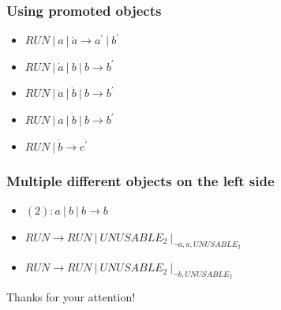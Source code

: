     \begin{frame}[t]\frametitle{Using promoted objects}
      \begin{itemize}
        \item $RUN\ |\ a\ |\ \dot{a} \rightarrow a^{\prime}\ |\ b^{\prime}$
        \item $RUN\ |\ \dot{a}\ |\ b\ |\ b \rightarrow b^{\prime}$
        \item $RUN\ |\ \dot{a}\ |\ \dot{b}\ |\ b \rightarrow b^{\prime}$
        \item $RUN\ |\ a\ |\ \dot{b}\ |\ b \rightarrow b^{\prime}$
        \item $RUN\ |\ \dot{b} \rightarrow c^{\prime}$
      \end{itemize}
    \end{frame}
    \note{}

    \begin{frame}[t]\frametitle{Multiple different objects on the left side}
      \begin{itemize}
        \item $(2): a\ |\ b\ |\ b \rightarrow b$
        \item $RUN \rightarrow RUN\ |\ UNUSABLE_2\ |_{\neg{a,\dot{a},UNUSABLE_2}}$
        \item $RUN \rightarrow RUN\ |\ UNUSABLE_2\ |_{\neg{b,UNUSABLE_2}}$
      \end{itemize}
    \end{frame}
    \note{}

    \begin{frame}[plain]
      \begin{center}
        Thanks for your attention!
      \end{center}
    \end{frame}

    \providecommand{\narrow}[1]{\scalebox{.8}[1.0]{#1}}




\newsavebox\mytempbib
\savebox\mytempbib{\parbox{\textwidth}{}}


